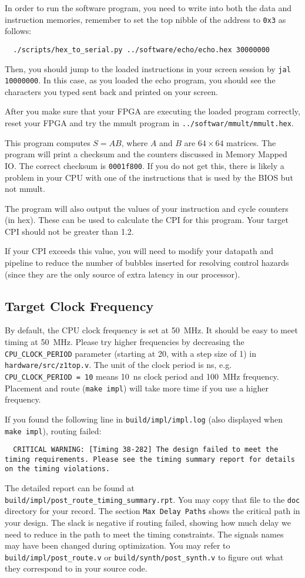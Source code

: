 In order to run the software program,
you need to write into both the data and instruction memories,
remember to set the top nibble of the address to \verb|0x3| as follows:
\begin{verbatim}
  ./scripts/hex_to_serial.py ../software/echo/echo.hex 30000000
\end{verbatim}
Then, you should jump to the loaded instructions in your screen session by \verb|jal 10000000|.
In this case, as you loaded the echo program, you should see the characters you typed
sent back and printed on your screen.

After you make sure that your FPGA are executing the loaded program correctly,
reset your FPGA and try the mmult program in \verb|../softwar/mmult/mmult.hex|.

This program computes $S=AB$, where $A$ and $B$ are $64 \times 64$ matrices.
The program will print a checksum and the counters discussed in Memory Mapped IO.
The correct checksum is \verb|0001f800|.
If you do not get this, there is likely a problem in your CPU with one of the instructions that is used by the BIOS but not mmult.

The program will also output the values of your instruction and cycle counters (in hex).
These can be used to calculate the CPI for this program.
Your target CPI should not be greater than 1.2.

If your CPI exceeds this value, you will need to modify your datapath and pipeline
to reduce the number of bubbles inserted for resolving control hazards
(since they are the only source of extra latency in our processor).

\subsection{Target Clock Frequency}
By default, the CPU clock frequency is set at 50~MHz.
It should be easy to meet timing at 50~MHz.
Please try higher frequencies by decreasing the \verb|CPU_CLOCK_PERIOD| parameter
(starting at 20, with a step size of 1) in \verb|hardware/src/z1top.v|.
The unit of the clock period is ns,
e.g. \verb|CPU_CLOCK_PERIOD = 10| means 10~ns clock period and 100~MHz frequency.
Placement and route (\verb|make impl|) will take more time if you use a higher frequency.

If you found the following line in \verb|build/impl/impl.log|
(also displayed when \verb|make impl|), routing failed:
\begin{verbatim}
  CRITICAL WARNING: [Timing 38-282] The design failed to meet the timing requirements. Please see the timing summary report for details on the timing violations.
\end{verbatim}
The detailed report can be found at \verb|build/impl/post_route_timing_summary.rpt|.
You may copy that file to the \verb|doc| directory for your record.
The section \verb|Max Delay Paths| shows the critical path in your design.
The slack is negative if routing failed, showing how much delay we need to reduce in the path
to meet the timing constraints.
The signals names may have been changed during optimization.
You may refer to \verb|build/impl/post_route.v| or \verb|build/synth/post_synth.v|
to figure out what they correspond to in your source code.


\newpage
